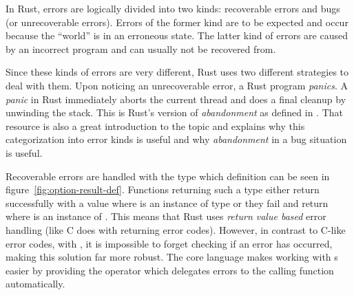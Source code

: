 In Rust, errors are logically divided into two kinds: recoverable errors and bugs (or unrecoverable errors).
Errors of the former kind are to be expected and occur because the \enquote{world} is in an erroneous state.
The latter kind of errors are caused by an incorrect program and can usually not be recovered from.

Since these kinds of errors are very different, Rust uses two different strategies to deal with them.
Upon noticing an unrecoverable error, a Rust program \emph{panics}.
A \emph{panic} in Rust immediately aborts the current thread and does a final cleanup by unwinding the stack.
This is Rust's version of \emph{abandonment} as defined in \cite{duffy2016error}.
That resource is also a great introduction to the topic and explains why this categorization into error kinds is useful and why \emph{abandonment} in a bug situation is useful.

Recoverable errors are handled with the  type which definition can be seen in figure~\ref{fig:option-result-def}.
Functions returning such a type either return successfully with a value  where  is an instance of type  or they fail and return  where  is an instance of .
This means that Rust uses \emph{return value based} error handling (like C does with returning error codes).
However, in contrast to C-like error codes, with , it is impossible to forget checking if an error has occurred, making this solution far more robust.
The core language makes working with s easier by providing the  operator which delegates errors to the calling function automatically.




